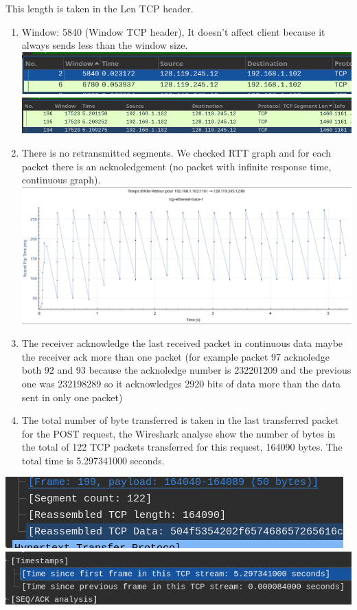 \documentclass[a4paper,11pt,final]{report}
\begin{document}
This length is taken in the Len TCP header.

\begin{enumerate}
\def\labelenumi{\arabic{enumi}.}
\setcounter{enumi}{8}
\item
  Window: 5840 (Window TCP header), It doesn't affect client because it
  always sends less than the window size.\\
  \includegraphics[width=0.7\linewidth]{upload_f2a87ad55988e55c582738446566f262.png}\\
  \includegraphics[width=0.7\linewidth]{upload_1d4a19c44f53f5db8f0cd7411ce33459.png}
\item
  There is no retransmitted segments. We checked RTT graph and for each
  packet there is an acknoledgement (no packet with infinite response
  time, continuous graph).\\
  \includegraphics[width=0.7\linewidth]{upload_b63617d46a8846deeecfd63e107b094b.png}
\item
  The receiver acknowledge the last received packet in continuous data
  maybe the receiver ack more than one packet (for example packet 97
  acknoledge both 92 and 93 because the acknoledge number is 232201209
  and the previous one was 232198289 so it acknowledges 2920 bits of
  data more than the data sent in only one packet)
\item
  The total number of byte transferred is taken in the last transferred
  packet for the POST request, the Wireshark analyse show the number of
  bytes in the total of 122 TCP packets transferred for this request,
  164090 bytes. The total time is 5.297341000 seconds.
\end{enumerate}

\includegraphics[width=0.7\linewidth]{upload_140917a895fff71033961f02b9f90110.png}\\
\includegraphics[width=0.7\linewidth]{upload_aaee14434fb3ed8d3e26b829b4d59ef6.png}
\end{document}
